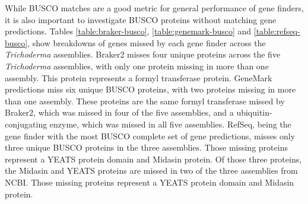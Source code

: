 While BUSCO matches are a good metric for general performance of gene
finders, it is also important to investigate BUSCO proteins without
matching gene predictions. Tables \ref{table:braker-busco},
\ref{table:genemark-busco} and \ref{table:refseq-busco}, show
breakdowns of genes missed by each gene finder across the
\textit{Trichoderma} assemblies. Braker2 misses four unique proteins
across the five \textit{Trichoderma} assemblies, with only one protein
missing in more than one assembly. This protein represents a formyl
transferase protein. GeneMark predictions miss six unique BUSCO
proteins, with two proteins missing in more than one assembly. These
proteins are the same formyl transferase missed by Braker2, which was
missed in four of the five assemblies, and a ubiquitin-conjugating
enzyme, which was missed in all five assemblies. RefSeq, being the
gene finder with the most BUSCO complete set of gene predictions,
misses only three unique BUSCO proteins in the three assemblies. Those
missing proteins represent a YEATS protein domain and Midasin
protein. Of those three proteins, the Midasin and YEATS proteins are
missed in two of the three assemblies from NCBI. Those missing
proteins represent a YEATS protein domain and Midasin protein.



